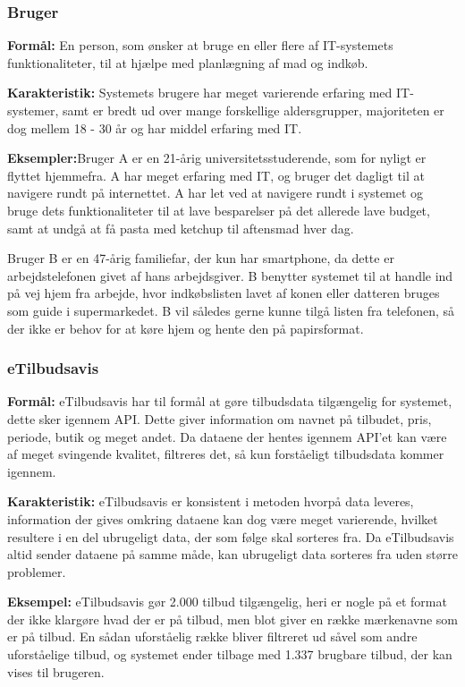 \subsubsection*{Bruger}

\textbf{Formål:} En person, som ønsker at bruge en eller flere af IT-systemets funktionaliteter, til at hjælpe med planlægning af mad og indkøb.

\textbf{Karakteristik:} Systemets brugere har meget varierende erfaring med IT-systemer, samt er bredt ud over mange forskellige aldersgrupper, majoriteten er dog mellem 18 - 30 år og har middel erfaring med IT.

\textbf{Eksempler:}Bruger A er en 21-årig universitetsstuderende, som for nyligt er flyttet hjemmefra. A har meget erfaring med IT, og bruger det dagligt til at navigere rundt på internettet.
A har let ved at navigere rundt i systemet og bruge dets funktionaliteter til at lave besparelser på det allerede lave budget, samt at undgå at få pasta med ketchup til aftensmad hver dag.

Bruger B er en 47-årig familiefar, der kun har smartphone, da dette er arbejdstelefonen givet af hans arbejdsgiver.
B benytter systemet til at handle ind på vej hjem fra arbejde, hvor indkøbslisten lavet af konen eller datteren bruges som guide i supermarkedet.
B vil således gerne kunne tilgå listen fra telefonen, så der ikke er behov for at køre hjem og hente den på papirsformat.

\subsubsection*{eTilbudsavis}

\textbf{Formål:} eTilbudsavis har til formål at gøre tilbudsdata tilgængelig for systemet, dette sker igennem API.
Dette giver information om navnet på tilbudet, pris, periode, butik og meget andet.
Da dataene der hentes igennem API'et kan være af meget svingende kvalitet, filtreres det, så kun forståeligt tilbudsdata kommer igennem.

\textbf{Karakteristik:} eTilbudsavis er konsistent i metoden hvorpå data leveres, information der gives omkring dataene kan dog være meget varierende, hvilket resultere i en del ubrugeligt data, der som følge skal sorteres fra.
Da eTilbudsavis altid sender dataene på samme måde, kan ubrugeligt data sorteres fra uden større problemer.

\textbf{Eksempel:} eTilbudsavis gør 2.000 tilbud tilgængelig, heri er nogle på et format der ikke klargøre hvad der er på tilbud, men blot giver en række mærkenavne som er på tilbud.
En sådan uforståelig række bliver filtreret ud såvel som andre uforståelige tilbud, og systemet ender tilbage med 1.337 brugbare tilbud, der kan vises til brugeren.

